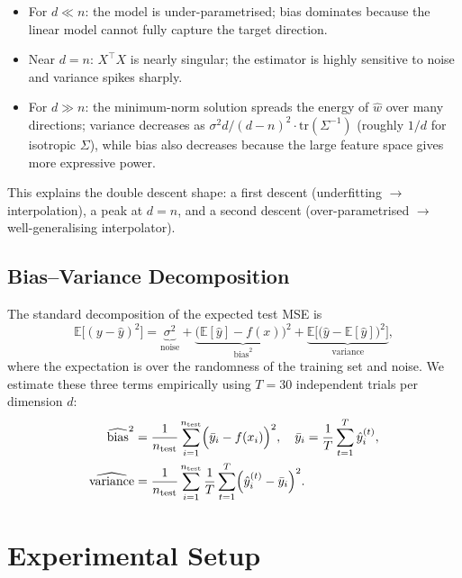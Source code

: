 \documentclass[11pt,a4paper]{article}
\begin{document}
\begin{itemize}
  \item For $d \ll n$: the model is under-parametrised; bias dominates because the linear
        model cannot fully capture the target direction.
  \item Near $d = n$: $X^\top X$ is nearly singular; the estimator is highly sensitive to
        noise and variance spikes sharply.
  \item For $d \gg n$: the minimum-norm solution spreads the energy of $\hat{w}$ over many
        directions; variance decreases as $\sigma^2 d / (d - n)^2 \cdot \mathrm{tr}(\Sigma^{-1})$
        (roughly $1/d$ for isotropic $\Sigma$), while bias also decreases because the large
        feature space gives more expressive power.
\end{itemize}

This explains the double descent shape: a first descent (underfitting $\to$ interpolation),
a peak at $d = n$, and a second descent (over-parametrised $\to$ well-generalising
interpolator).

\subsection{Bias--Variance Decomposition}

The standard decomposition of the expected test MSE is
\[
  \mathbb{E}\bigl[(y - \hat{y})^2\bigr]
  = \underbrace{\sigma^2}_{\text{noise}}
  + \underbrace{\bigl(\mathbb{E}[\hat{y}] - f(x)\bigr)^2}_{\text{bias}^2}
  + \underbrace{\mathbb{E}\bigl[\bigl(\hat{y} - \mathbb{E}[\hat{y}]\bigr)^2\bigr]}_{\text{variance}},
\]
where the expectation is over the randomness of the training set and noise.
We estimate these three terms empirically using $T = 30$ independent trials per dimension $d$:
\begin{align*}
  \widehat{\mathrm{bias}}^2 &= \frac{1}{n_{\mathrm{test}}} \sum_{i=1}^{n_{\mathrm{test}}}
    \Bigl(\bar{y}_i - f(x_i)\Bigr)^2, \quad \bar{y}_i = \frac{1}{T}\sum_{t=1}^T \hat{y}_i^{(t)},\\
  \widehat{\mathrm{variance}} &= \frac{1}{n_{\mathrm{test}}} \sum_{i=1}^{n_{\mathrm{test}}}
    \frac{1}{T}\sum_{t=1}^T \Bigl(\hat{y}_i^{(t)} - \bar{y}_i\Bigr)^2.
\end{align*}


\section{Experimental Setup}
\label{sec:setup}
\end{document}
